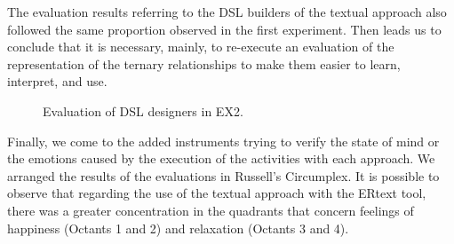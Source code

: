 The evaluation results referring to the DSL builders of the textual approach also followed the same proportion observed in the first experiment.
Then leads us to conclude that it is necessary, mainly, to re-execute an evaluation of the representation of the ternary relationships to make them easier to learn, interpret, and use.

\begin{figure}[!htb]
    \centering
    \caption{Evaluation of DSL designers in EX2.}
    \label{fig:inst4GERALExp2}
    
\end{figure}

Finally, we come to the added instruments trying to verify the state of mind or the emotions caused by the execution of the activities with each approach.
We arranged the results of the evaluations in Russell's Circumplex. 
It is possible to observe that regarding the use of the textual approach with the ERtext tool, there was a greater concentration in the quadrants that concern feelings of happiness (Octants 1 and 2) and relaxation (Octants 3 and 4).

